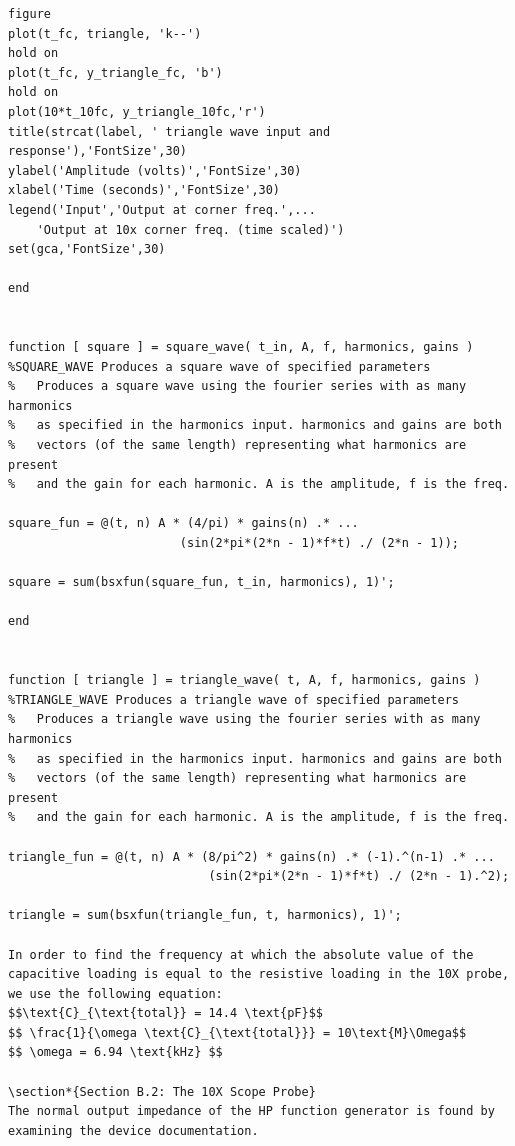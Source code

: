 \documentclass[12pt,letterpaper]{report}
\begin{document}
\begin{verbatim}
figure
plot(t_fc, triangle, 'k--')
hold on
plot(t_fc, y_triangle_fc, 'b')
hold on
plot(10*t_10fc, y_triangle_10fc,'r')
title(strcat(label, ' triangle wave input and response'),'FontSize',30)
ylabel('Amplitude (volts)','FontSize',30)
xlabel('Time (seconds)','FontSize',30)
legend('Input','Output at corner freq.',...
    'Output at 10x corner freq. (time scaled)')
set(gca,'FontSize',30)

end


function [ square ] = square_wave( t_in, A, f, harmonics, gains )
%SQUARE_WAVE Produces a square wave of specified parameters
%   Produces a square wave using the fourier series with as many harmonics
%   as specified in the harmonics input. harmonics and gains are both
%   vectors (of the same length) representing what harmonics are present
%   and the gain for each harmonic. A is the amplitude, f is the freq.

square_fun = @(t, n) A * (4/pi) * gains(n) .* ...
                        (sin(2*pi*(2*n - 1)*f*t) ./ (2*n - 1));

square = sum(bsxfun(square_fun, t_in, harmonics), 1)';

end


function [ triangle ] = triangle_wave( t, A, f, harmonics, gains )
%TRIANGLE_WAVE Produces a triangle wave of specified parameters
%   Produces a triangle wave using the fourier series with as many harmonics
%   as specified in the harmonics input. harmonics and gains are both
%   vectors (of the same length) representing what harmonics are present
%   and the gain for each harmonic. A is the amplitude, f is the freq.

triangle_fun = @(t, n) A * (8/pi^2) * gains(n) .* (-1).^(n-1) .* ...
                            (sin(2*pi*(2*n - 1)*f*t) ./ (2*n - 1).^2);

triangle = sum(bsxfun(triangle_fun, t, harmonics), 1)';

In order to find the frequency at which the absolute value of the capacitive loading is equal to the resistive loading in the 10X probe, we use the following equation:
$$\text{C}_{\text{total}} = 14.4 \text{pF}$$
$$ \frac{1}{\omega \text{C}_{\text{total}}} = 10\text{M}\Omega$$
$$ \omega = 6.94 \text{kHz} $$

\section*{Section B.2: The 10X Scope Probe}
The normal output impedance of the HP function generator is found by examining the device documentation. 



\end{verbatim}
\end{document}
